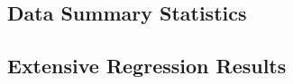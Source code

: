 \newpage
\subsection{Data Summary Statistics}








\newpage
\subsection{Extensive Regression Results}







